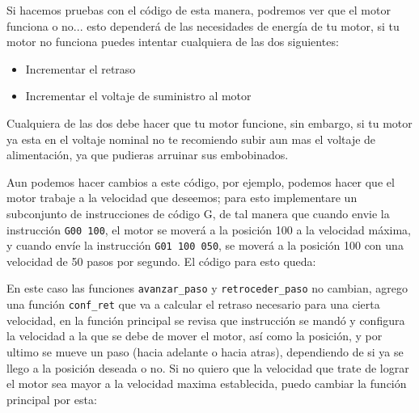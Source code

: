 		\begin{multicols}{2}
			

			
		\end{multicols}

		Si hacemos pruebas con el código de esta manera, podremos ver que el motor funciona o no... esto dependerá de las necesidades de energía de tu motor, si tu motor no funciona puedes intentar cualquiera de las dos siguientes:

		\begin{itemize}
			\item Incrementar el retraso
			\item Incrementar el voltaje de suministro al motor
		\end{itemize}

		Cualquiera de las dos debe hacer que tu motor funcione, sin embargo, si tu motor ya esta en el voltaje nominal no te recomiendo subir aun mas el voltaje de alimentación, ya que pudieras arruinar sus embobinados.

		Aun podemos hacer cambios a este código, por ejemplo, podemos hacer que el motor trabaje a la velocidad que deseemos; para esto implementare un subconjunto de instrucciones de código G, de tal manera que cuando envie la instrucción \texttt{G00 100}, el motor se moverá a la posición 100 a la velocidad máxima, y cuando envíe la instrucción \texttt{G01 100 050}, se moverá a la posición 100 con una velocidad de 50 pasos por segundo. El código para esto queda:

		\newpage

		\begin{fullwidth}
			\begin{multicols}{2}
				
			\end{multicols}
		\end{fullwidth}

		\newpage

		En este caso las funciones \texttt{avanzar\_paso} y \texttt{retroceder\_paso} no cambian, agrego una función \texttt{conf\_ret} que va a calcular el retraso necesario para una cierta velocidad, en la función principal se revisa que instrucción se mandó y configura la velocidad a la que se debe de mover el motor, así como la posición, y por ultimo se mueve un paso (hacia adelante o hacia atras), dependiendo de si ya se llego a la posición deseada o no. Si no quiero que la velocidad que trate de lograr el motor sea mayor a la velocidad maxima establecida, puedo cambiar la función principal por esta:

